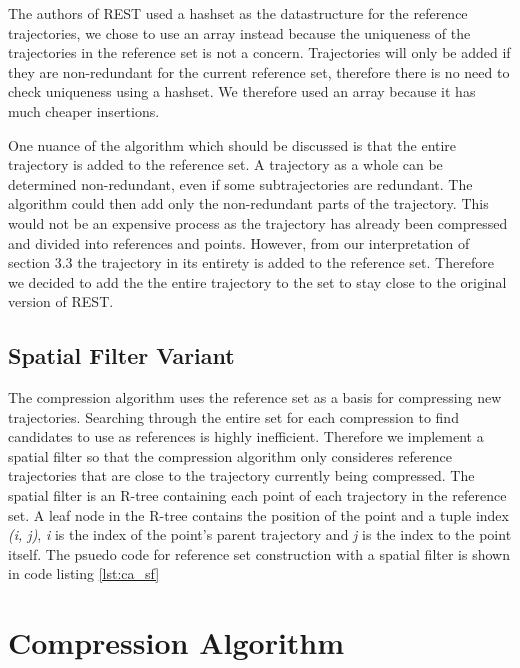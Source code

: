The authors of REST used a hashset as the datastructure for the reference trajectories, we chose to use an array instead because the uniqueness of the trajectories in the reference set is not a concern. Trajectories will only be added if they are non-redundant for the current reference set, therefore there is no need to check uniqueness using a hashset. We therefore used an array because it has much cheaper insertions.

One nuance of the algorithm which should be discussed is that the entire trajectory is added to the reference set. A trajectory as a whole can be determined non-redundant, even if some subtrajectories are redundant. The algorithm could then add only the non-redundant parts of the trajectory. This would not be an expensive process as the trajectory has already been compressed and divided into references and points. However, from our interpretation of \cite{zhao2018rest} section 3.3 the trajectory in its entirety is added to the reference set. Therefore we decided to add the the entire trajectory to the set to stay close to the original version of REST.

\subsection{Spatial Filter Variant}

The compression algorithm uses the reference set as a basis for compressing new trajectories. Searching through the entire set for each compression to find candidates to use as references is highly inefficient. Therefore we implement a spatial filter so that the compression algorithm only consideres reference trajectories that are close to the trajectory currently being compressed. The spatial filter is an R-tree containing each point of each trajectory in the reference set. A leaf node in the R-tree contains the position of the point and a tuple index \textit{(i, j)}, \textit{i} is the index of the point's parent trajectory and \textit{j} is the index to the point itself. The psuedo code for reference set construction with a spatial filter is shown in code listing \ref{lst:ca_sf}

\section{Compression Algorithm}
